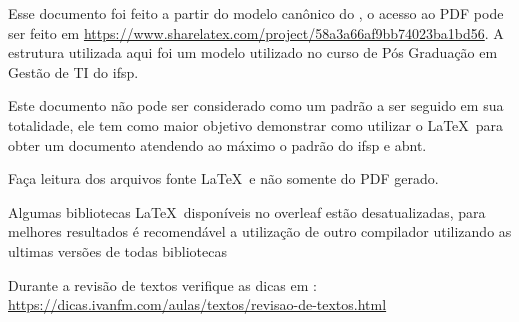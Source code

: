 \newcommand{\urlmodelosimples}{https://www.sharelatex.com/project/58a3a66af9bb74023ba1bd56}

\newcommand{\urlmodelo}{\url{\urlmodelosimples}}

Esse documento foi feito a partir do modelo canônico do \abnTeX, o acesso ao PDF pode ser feito em 
\urlmodelo. A estrutura utilizada aqui foi um modelo utilizado no curso de Pós Graduação em Gestão de TI do \ac{ifsp}.



Este documento não pode ser considerado como um padrão a ser seguido em sua totalidade, ele tem como maior objetivo demonstrar como utilizar o \LaTeX\ para obter um documento atendendo ao máximo o padrão do \ac{ifsp} e \ac{abnt}.

Faça leitura dos arquivos fonte \LaTeX\ e não somente do PDF gerado.

Algumas bibliotecas \LaTeX\ disponíveis no overleaf estão desatualizadas, para melhores resultados é recomendável a utilização de outro compilador utilizando as ultimas versões de todas bibliotecas

Durante a revisão de textos verifique as dicas em : \url{https://dicas.ivanfm.com/aulas/textos/revisao-de-textos.html}


\noindent\hrulefill



\newpage
